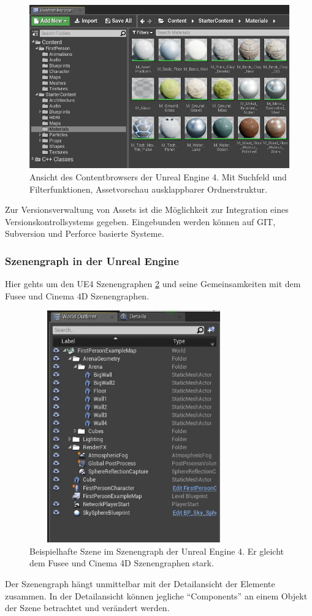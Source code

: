 \documentclass[pagesize, paper=a4, fontsize=12pt, titlepage=true, headings=small, headnosepline, abstractoff, liststotoc, nochapterprefix, plainheadsepline, twoside]{scrreprt}
\begin{document}
\begin{figure}[ht]
	\centering
	\includegraphics[width=\linewidth]{Bilder/UE_Contentbrowser.JPG}
	\caption{Ansicht des Contentbrowsers der Unreal Engine 4. Mit Suchfeld und Filterfunktionen, Assetvorschau ausklappbarer Ordnerstruktur.}
	\label{UEContentbrowser}
\end{figure}

Zur Versionsverwaltung von Assets ist die Möglichkeit zur Integration eines Versionskontrollsystems gegeben. Eingebunden werden können auf GIT, Subversion und Perforce basierte Systeme.

\subsubsection{Szenengraph in der Unreal Engine}
Hier gehts um den UE4 Szenengraphen \ref{UESzenenGraph} und seine Gemeinsamkeiten mit dem Fusee und Cinema 4D Szenengraphen.
\begin{figure}[ht]
	\centering
	\includegraphics[width=9cm, height=10cm]{Bilder/UESzenenGraph.JPG}
	\caption{Beispielhafte Szene im Szenengraph der Unreal Engine 4. Er gleicht dem Fusee und Cinema 4D Szenengraphen stark.}
	\label{UESzenenGraph}
\end{figure}
Der Szenengraph hängt unmittelbar mit der Detailansicht der Elemente zusammen. In der Detailansicht können jegliche “Components” an einem Objekt der Szene betrachtet und verändert werden.
\end{document}
